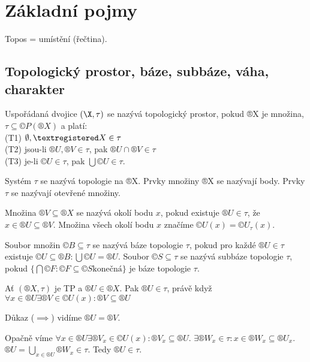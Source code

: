 \documentclass[12pt]{article}					%
\begin{document}
\section{Základní pojmy}
    Topos = umístění (řečtina).

    \subsection{Topologický prostor, báze, subbáze, váha, charakter}

    \begin{definice}
        Uspořádaná dvojice $(\X, \tau)$ se nazývá topologický prostor, pokud ®X je množina, $\tau \subseteq ©P(®X)$ a platí:\\
        (T1) $\O, ®X \in \tau$\\
        (T2) jsou-li $®U, ®V \in \tau$, pak $®U \cap ®V \in \tau$\\
        (T3) je-li $©U \in \tau$, pak $\bigcup ©U \in \tau$.
    \end{definice}

    \begin{definice}[Topologie]
        Systém $\tau$ se nazývá topologie na ®X. Prvky množiny ®X se nazývají body. Prvky $\tau$ se nazývají otevřené množiny.
    \end{definice}

    \begin{definice}
        Množina $®V \subseteq ®X$ se nazývá okolí bodu $x$, pokud existuje $®U \in \tau$, že $x \in ®U \subseteq ®V$. Množina všech okolí bodu $x$ značíme $©U(x) = ©U_\tau(x)$.
    \end{definice}

    \begin{definice}
        Soubor množin $©B \subseteq \tau$ se nazývá báze topologie $\tau$, pokud pro každé $®U\in \tau$ existuje $©U \subseteq ®B: \bigcup ©U = ®U$. Soubor $©S \subseteq \tau$ se nazývá subbáze topologie $\tau$, pokud $\{\bigcap ©F: ©F \subseteq ©S \text{konečná}\}$ je báze topologie $\tau$.
    \end{definice}

    \begin{tvrzeni}
        Ať $(®X, \tau)$ je TP a $®U \in ®X$. Pak $®U \in \tau$, právě když $\forall x \in ®U \exists ®V\in ©U(x): ®V \subseteq ®U$
        \begin{dukazin}
            Důkaz ($\implies$) vidíme $®U = ®V$.

            Opačně víme $\forall x \in ®U \exists ®V_x\in©U(x): ®V_x \subseteq ®U$. $\exists ®W_x \in \tau: x\in ®W_x \subseteq ®U_x$. $®U = \bigcup_{x\in ®U}®W_x \in \tau$. Tedy $®U \in \tau$.
        \end{dukazin}
    \end{tvrzeni}
\end{document}
